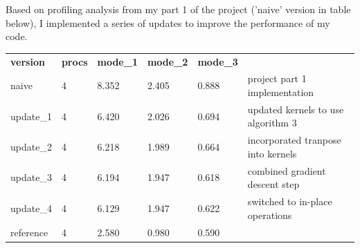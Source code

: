 \documentclass[12pt,letterpaper,twoside]{article}
\begin{document}
Based on profiling analysis from my part 1 of the project ('naive' version in table below),
I implemented a series of updates to improve the performance of my code.
\begin{table}[h]
    \begin{tabular}{llllll}
    \textbf{version} & \textbf{procs} & \textbf{mode\_1} & \textbf{mode\_2} & \textbf{mode\_3} &                                      \\
    naive            & 4              & 8.352            & 2.405            & 0.888            & project part 1 implementation        \\
    update\_1        & 4              & 6.420            & 2.026            & 0.694            & updated kernels to use algorithm 3   \\
    update\_2        & 4              & 6.218            & 1.989            & 0.664            & incorporated tranpose into kernels   \\
    update\_3        & 4              & 6.194            & 1.947            & 0.618            & combined gradient descent step       \\
    update\_4        & 4              & 6.129            & 1.947            & 0.622            & switched to in-place operations      \\
    reference        & 4              & 2.580            & 0.980            & 0.590            &
    \end{tabular}
\end{table}
\end{document}
